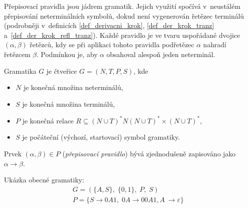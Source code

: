Přepisovací pravidla jsou jádrem gramatik.
Jejich využití spočívá v~neustálém přepisování neterminálních symbolů, dokud není vygenerován řetězec terminálů (podrobněji v~definicích \ref{def_derivacni_krok}, \ref{def_der_krok_tranz} a~\ref{def_der_krok_refl_tranz}).
Každé pravidlo je ve tvaru uspořádané dvojice $(\alpha, \beta)$ řetězců, kdy se při aplikaci tohoto pravidla podřetězec $\alpha$ nahradí řetězcem $\beta$.
Podmínkou je, aby $\alpha$ obsahoval alespoň jeden neterminál.

\begin{definition}\label{def_gramatika}
    Gramatika $G$ je čtveřice $G = (N, T, P, S)$, kde
    \begin{itemize}
        \item $N$ je konečná množina neterminálů,
        \item $S$ je konečná množina terminálů,
        \item $P$ je konečná relace $R \subseteq (N \cup T)^*N(N \cup T)^* \times (N \cup T)^*$,
        \item $S$ je počáteční (výchozí, startovací) symbol gramatiky.
    \end{itemize}
    Prvek $(\alpha, \beta) \in P$ (\emph{přepisovací pravidlo}) bývá zjednodušeně zapisováno jako $\alpha \rightarrow \beta$.
\end{definition}

\begin{example}
	Ukázka obecné gramatiky:
    \begin{gather*}
        G = (\{A, S\},\; \{0, 1\},\; P,\; S) \\
        P = \{S \rightarrow 0A1,\; 0A \rightarrow 00A1, A~\rightarrow \varepsilon\}
    \end{gather*}
\end{example}

